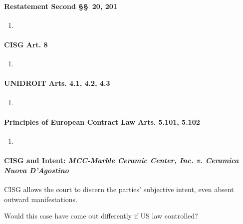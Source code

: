 \paragraph{Restatement Second \S\S\ 20, 201}

\begin{enumerate}
    \item %
\end{enumerate}

\paragraph{CISG Art. 8}

\begin{enumerate}
    \item %
\end{enumerate}

\paragraph{UNIDROIT Arts. 4.1, 4.2, 4.3}

\begin{enumerate}
    \item %
\end{enumerate}

\paragraph{Principles of European Contract Law Arts. 5.101, 5.102}

\begin{enumerate}
    \item %
\end{enumerate}

\paragraph{CISG and Intent: \emph{MCC-Marble Ceramic Center, Inc. v. 
Ceramica Nuova D'Agostino}}

CISG allows the court to discern the parties' subjective intent, even absent 
outward manifestations.

Would this case have come out differently if US law controlled?

